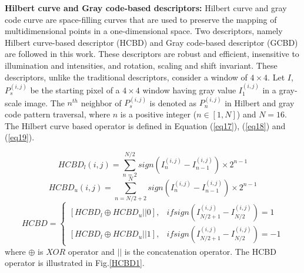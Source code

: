 \par

\noindent \textbf{Hilbert curve and Gray code-based descriptors:}
Hilbert curve and gray code curve are space-filling curves that are used to preserve the
mapping of multidimensional points in a one-dimensional space. Two descriptors,
namely  Hilbert curve-based descriptor
(HCBD) and Gray code-based descriptor (GCBD) are followed in this work. These
descriptors are robust and efficient, insensitive to illumination and
intensities, and rotation, scaling and shift invariant. These descriptors, unlike
the traditional descriptors, consider a window of $4 \times 4$.  Let $I$,
$P_{s}^{(i,j)}$ be the starting pixel of a  $4 \times 4$  window having gray
value $I_{1}^{(i,j)}$ in a gray-scale image. The $n^{th}$ neighbor of
$P_{s}^{(i,j)}$ is denoted as $P_{n}^{(i,j)}$ in Hilbert and gray code pattern
traversal, where $n$ is a positive integer ($n \in [1,N]$)  and $N=16$. The
Hilbert curve based operator is defined in Equation (\ref{eq17}), (\ref{eq18})
and (\ref{eq19}).

\begin{equation}\label{eq17}
	HCBD_{l}(i,j)=\sum_{n=2}^{N/2}sign(I_{n}^{(i,j)}-I_{n-1}^{(i,j)})\times 2^{n-1}
\end{equation}
\begin{equation}\label{eq18}
	HCBD_{u}(i,j)=\sum_{n=N/2+2}^{N}sign(I_{n}^{(i,j)}-I_{n-1}^{(i,j)})\times 2^{n-1}
\end{equation}
\begin{equation}\label{eq19}
	HCBD=\left\{\begin{matrix}
		[HCBD_{l} \oplus  HCBD_{u} || 0] , & if sign(I_{N/2+1}^{(i,j)}-I_{N/2}^{(i,j)})=1   \\
		[HCBD_{l} \oplus  HCBD_{u} || 1],  & if  sign(I_{N/2+1}^{(i,j)}-I_{N/2}^{(i,j)})=-1
	\end{matrix}\right.
\end{equation}
where $\oplus$ is $XOR$ operator and $||$ is the concatenation operator. The
HCBD operator is illustrated in Fig.\ref{HCBD1}.

